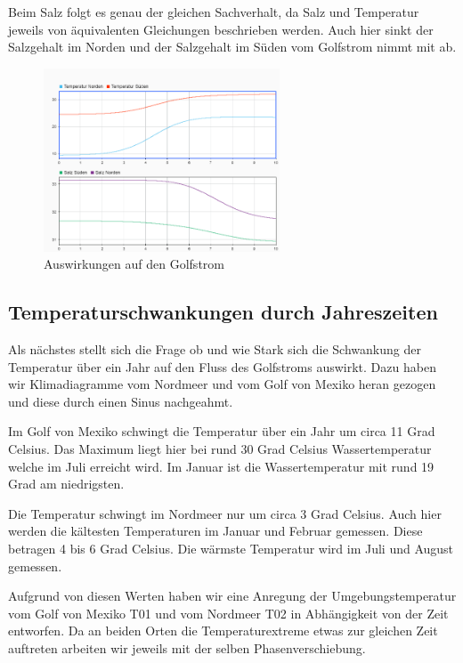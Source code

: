 \documentclass[a4paper,twoside]{article}
\begin{document}
	Beim Salz folgt es genau der gleichen Sachverhalt, da Salz und Temperatur jeweils von äquivalenten Gleichungen beschrieben werden. Auch hier sinkt der Salzgehalt im Norden und der Salzgehalt im Süden vom Golfstrom nimmt mit ab.

	\begin{figure}[!h]
  		\centering
 		\includegraphics[width=7cm]{../Diagramme/Arktis_schmiltz_werte.png}
  		\caption{Auswirkungen auf den Golfstrom}
  		\label{fig:schmilztGolf}
	\end{figure}

	\subsection{Temperaturschwankungen durch Jahreszeiten} \label{TempDurchJahreszeiten}
	
	Als nächstes stellt sich die Frage ob und wie Stark sich die Schwankung der Temperatur über ein Jahr auf den Fluss des Golfstroms auswirkt. Dazu haben wir Klimadiagramme vom Nordmeer und vom Golf von Mexiko heran gezogen und diese durch einen Sinus nachgeahmt. 
	
	Im Golf von Mexiko schwingt die Temperatur über ein Jahr um circa 11 Grad Celsius. Das Maximum liegt hier bei rund 30 Grad Celsius Wassertemperatur welche im Juli erreicht wird. Im Januar ist die Wassertemperatur mit rund 19 Grad am niedrigsten.
	
	Die Temperatur schwingt im Nordmeer nur um circa 3 Grad Celsius. Auch hier werden die kältesten Temperaturen im Januar und Februar gemessen. Diese betragen 4 bis 6 Grad Celsius. Die wärmste Temperatur wird im Juli und August gemessen. 
	
	Aufgrund von diesen Werten haben wir eine Anregung der Umgebungstemperatur vom Golf von Mexiko T01 und vom Nordmeer T02 in Abhängigkeit von der Zeit entworfen. Da an beiden Orten die Temperaturextreme etwas zur gleichen Zeit auftreten arbeiten wir jeweils mit der selben Phasenverschiebung. 
	
\end{document}
